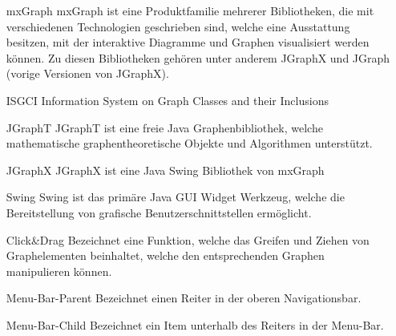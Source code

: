 \documentclass[10pt,a4paper]{article}
\begin{document}
	        \begin{itemize}
	        \item[mxGraph] mxGraph ist eine Produktfamilie mehrerer Bibliotheken, die mit verschiedenen Technologien geschrieben sind, welche eine Ausstattung besitzen, mit der interaktive Diagramme und Graphen visualisiert werden können. Zu diesen Bibliotheken gehören unter anderem JGraphX und JGraph (vorige Versionen von JGraphX).
	        \item[ISGCI] Information System on Graph Classes and their Inclusions
	        \item[JGraphT] JGraphT ist eine freie Java Graphenbibliothek, welche mathematische graphentheoretische Objekte und Algorithmen unterstützt. 
	        \item[JGraphX] JGraphX ist eine Java Swing Bibliothek von mxGraph
	        \item[Swing] Swing ist das primäre Java GUI Widget Werkzeug, welche die Bereitstellung von grafische Benutzerschnittstellen ermöglicht.
	        \item[Click\&Drag] Bezeichnet eine Funktion, welche das Greifen und Ziehen von Graphelementen beinhaltet, welche den entsprechenden Graphen manipulieren können.
	        \item[Menu-Bar-Parent] Bezeichnet einen Reiter in der oberen Navigationsbar.
	        \item[Menu-Bar-Child] Bezeichnet ein Item unterhalb des Reiters in der Menu-Bar.
	        \end{itemize}
	        \newpage
\end{document}
